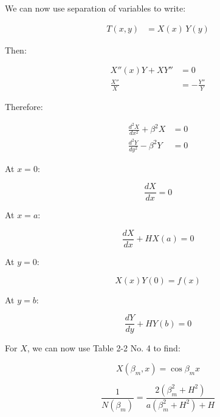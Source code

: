\documentclass[letterpaper,12pt]{article}
\begin{document}
We can now use separation of variables to write:

\begin{equation}
\begin{aligned}
    T(x, y)        &= X(x) \, Y(y)
\end{aligned}
\end{equation}

Then:

\begin{equation}
\begin{aligned}
    X''(x)Y + XY'' &= 0 \\
    \frac{X''}{X}  &= - \frac{Y''}{Y}
\end{aligned}
\end{equation}

Therefore:

\begin{equation}
\begin{aligned}
    \frac{d^2 X}{d x^2} + \beta^2 X &= 0 \\[6pt]
    \frac{d^2 Y}{d y^2} - \beta^2 Y &= 0
\end{aligned}
\end{equation}

At $x = 0$:

\begin{equation}
    \frac{dX}{dx} = 0
\end{equation}

At $x = a$:

\begin{equation}
    \frac{dX}{dx} + H X(a) = 0
\end{equation}

At $y = 0$:

\begin{equation}
    X(x) Y(0) = f(x)
\end{equation}

At $y = b$:

\begin{equation}
    \frac{dY}{dy} + HY(b) = 0
\end{equation}

For $X$, we can now use Table 2-2 No. 4 to find:

\begin{equation}
    X(\beta_m, x) = \cos{\beta_m x}
\end{equation}

\begin{equation}
    \frac{1}{N\left(\beta_m\right)} = \frac{2 \left(\beta^{2}_m + H^2 \right)}{a \left(\beta^{2}_m + H^2 \right) + H}
\end{equation}
\end{document}
